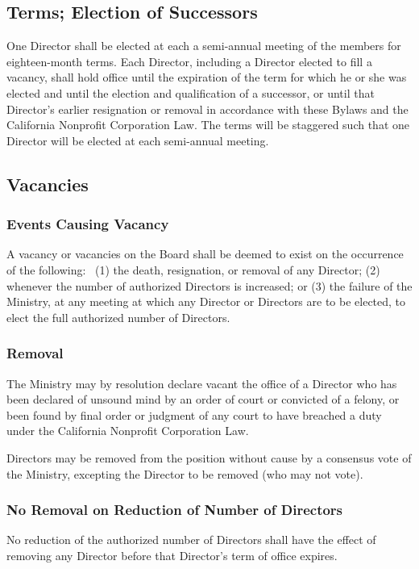 \documentclass[letterpaper,titlepage]{article}
\begin{document}
\subsection{Terms; Election of Successors}
\label{sec:terms}
One Director shall be elected at each a semi-annual meeting of the members for
eighteen-month terms. Each Director, including a Director elected to fill a
vacancy, shall hold office until the expiration of the term for which he or she
was elected and until the election and qualification of a successor, or until
that Director’s earlier resignation or removal in accordance with these Bylaws
and the California Nonprofit Corporation Law. The terms will be staggered such
that one Director will be elected at each semi-annual meeting.
\subsection{Vacancies}
\label{sec:vacancies}
\subsubsection{Events Causing Vacancy}
\label{sec:eventsVacancy}
A vacancy or vacancies on the Board shall be deemed to exist on the occurrence
of the following:  (1) the death, resignation, or removal of any Director; (2)
whenever the number of authorized Directors is increased; or (3) the failure of
the Ministry, at any meeting at which any Director or Directors are to be
elected, to elect the full authorized number of Directors.
\subsubsection{Removal}
\label{sec:removal}
The Ministry may by resolution declare vacant the office of a Director who has
been declared of unsound mind by an order of court or convicted of a felony, or
been found by final order or judgment of any court to have breached a duty
under the California Nonprofit Corporation Law.

Directors may be removed from the position without cause by a consensus vote of
the Ministry, excepting the Director to be removed (who may not vote).
\subsubsection{No Removal on Reduction of Number of Directors}
\label{sec:noRemoval}
No reduction of the authorized number of Directors shall have the effect of
removing any Director before that Director’s term of office expires.
\end{document}
